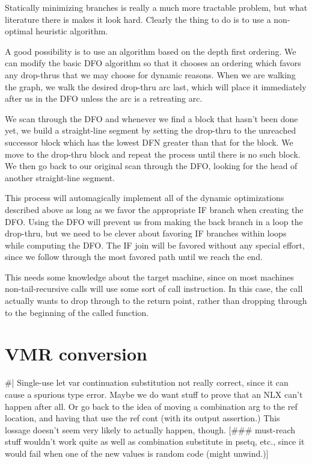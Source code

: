 Statically minimizing branches is really a much more tractable problem, but
what literature there is makes it look hard.  Clearly the thing to do is to use
a non-optimal heuristic algorithm.

A good possibility is to use an algorithm based on the depth first ordering.
We can modify the basic DFO algorithm so that it chooses an ordering which
favors any drop-thrus that we may choose for dynamic reasons.  When we are
walking the graph, we walk the desired drop-thru arc last, which will place it
immediately after us in the DFO unless the arc is a retreating arc.

We scan through the DFO and whenever we find a block that hasn't been done yet,
we build a straight-line segment by setting the drop-thru to the unreached
successor block which has the lowest DFN greater than that for the block.  We
move to the drop-thru block and repeat the process until there is no such
block.  We then go back to our original scan through the DFO, looking for the
head of another straight-line segment.

This process will automagically implement all of the dynamic optimizations
described above as long as we favor the appropriate IF branch when creating the
DFO.  Using the DFO will prevent us from making the back branch in a loop the
drop-thru, but we need to be clever about favoring IF branches within loops
while computing the DFO.  The IF join will be favored without any special
effort, since we follow through the most favored path until we reach the end.

This needs some knowledge about the target machine, since on most machines
non-tail-recursive calls will use some sort of call instruction.  In this case,
the call actually wants to drop through to the return point, rather than
dropping through to the beginning of the called function.


\chapter{VMR conversion}

\#|
Single-use let var continuation substitution not really correct, since it can
cause a spurious type error.  Maybe we do want stuff to prove that an NLX can't
happen after all.  Or go back to the idea of moving a combination arg to the
ref location, and having that use the ref cont (with its output assertion.)
This lossage doesn't seem very likely to actually happen, though.
[\#\#\# must-reach stuff wouldn't work quite as well as combination substitute in
psetq, etc., since it would fail when one of the new values is random code
(might unwind.)]

